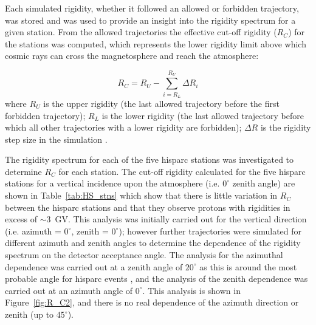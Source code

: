 Each simulated rigidity, whether it followed an allowed or forbidden trajectory, was stored and was used to provide an insight into the rigidity spectrum for a given station. From the allowed trajectories the effective cut-off rigidity ($R_C$) for the stations was computed, which represents the lower rigidity limit above which cosmic rays can cross the magnetosphere and reach the atmosphere:

\begin{equation}
\label{eq:cut_off}
R_C = R_U - \sum_{i = R_L}^{R_U} \Delta R_i
\end{equation}
%
where $R_U$ is the upper rigidity (the last allowed trajectory before the first forbidden trajectory); $R_L$ is the lower rigidity (the last allowed trajectory before which all other trajectories with a lower rigidity are forbidden); $\Delta R$ is the rigidity step size in the simulation \citep{shea_study_1965, desorgher_planetocosmics_2005, desorgher_planetocosmics_2006, herbst_influence_2013}.

The rigidity spectrum for each of the five \gls{hisparc} stations was investigated to determine $R_C$ for each station. The cut-off rigidity calculated for the five \gls{hisparc} stations for a vertical incidence upon the atmosphere (i.e. $0^\circ$ zenith angle) are shown in Table~\ref{tab:HS_stns} which show that there is little variation in $R_C$ between the \gls{hisparc} stations and that they observe protons with rigidities in excess of $\sim 3$~GV. This analysis was initially carried out for the vertical direction (i.e. azimuth = $0^\circ$, zenith = $0^\circ$); however further trajectories were simulated for different azimuth and zenith angles to determine the dependence of the rigidity spectrum on the detector acceptance angle. The analysis for the azimuthal dependence was carried out at a zenith angle of $20^\circ$ as this is around the most probable angle for \gls{hisparc} events \citep{fokkema_hisparc_2012}, and the analysis of the zenith dependence was carried out at an azimuth angle of $0^\circ$. This analysis is shown in Figure~\ref{fig:R_C2}, and there is no real dependence of the azimuth direction or zenith (up to $45^{\circ}$).


